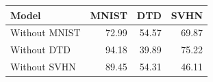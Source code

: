 \begin{tabular}{lrrr}
\toprule
Model & MNIST & DTD & SVHN \\
\midrule
Without MNIST & 72.99 & 54.57 & 69.87 \\
Without DTD & 94.18 & 39.89 & 75.22 \\
Without SVHN & 89.45 & 54.31 & 46.11 \\
\bottomrule
\end{tabular}
